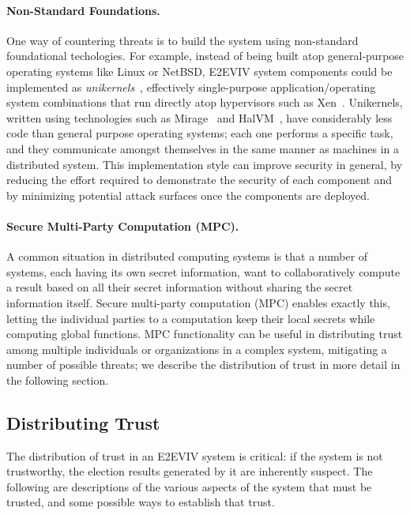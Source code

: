 \paragraph{Non-Standard Foundations.} One way of countering threats is
to build the system using non-standard foundational techologies. For
example, instead of being built atop general-purpose operating systems
like Linux or NetBSD, E2EVIV system components could be implemented as
\emph{unikernels}~\cite{Madhavapeddy13}, effectively single-purpose
application/operating system combinations that run directly atop
hypervisors such as Xen~\cite{Xen}. Unikernels, written using
technologies such as Mirage~\cite{OpenMirage} and HalVM~\cite{HalVM},
have considerably less code than general purpose operating systems;
each one performs a specific task, and they communicate amongst
themselves in the same manner as machines in a distributed
system. This implementation style can improve security in general, by
reducing the effort required to demonstrate the security of each
component and by minimizing potential attack surfaces once the
components are deployed. 

\paragraph{Secure Multi-Party Computation (MPC).} A common situation
in distributed computing systems is that a number of systems, each
having its own secret information, want to collaboratively compute a
result based on all their secret information without sharing the
secret information itself. Secure multi-party computation (MPC)
enables exactly this, letting the individual parties to a computation
keep their local secrets while computing global functions. MPC
functionality can be useful in distributing trust among multiple
individuals or organizations in a complex system, mitigating a number
of possible threats; we describe the distribution of trust in more
detail in the following section.


\subsection{Distributing Trust}
\label{sec:trust}

The distribution of trust in an E2EVIV system is critical: if the
system is not trustworthy, the election results generated by it are
inherently suspect. The following are descriptions of the various
aspects of the system that must be trusted, and some possible ways to
establish that trust.

